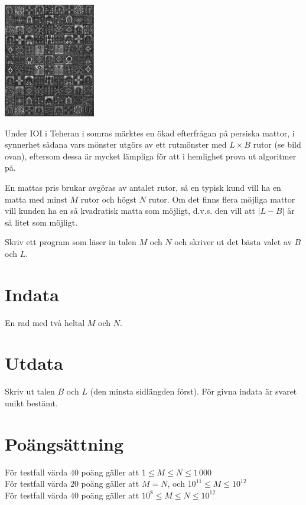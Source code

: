\begin{center}
\includegraphics[width=4cm]{matta.pdf}
\end{center}

Under IOI i Teheran i somras märktes en ökad efterfrågan på persiska
mattor, i synnerhet sådana vars mönster utgörs av ett rutmönster med $L
\times B$ rutor (se bild ovan), eftersom dessa är mycket lämpliga för att i
hemlighet prova ut algoritmer på.

En mattas pris brukar avgöras av antalet rutor, så en typisk kund vill
ha en matta med minst $M$ rutor och högst $N$ rutor. Om det finns flera
möjliga mattor vill kunden ha en så kvadratisk matta som möjligt,
d.v.s. den vill att $|L - B|$ är så litet som möjligt.

Skriv ett program som läser in talen $M$ och $N$ och skriver ut det
bästa valet av $B$ och $L$.

\section*{Indata}

En rad med två heltal $M$ och $N$.

\section*{Utdata}

Skriv ut talen $B$ och $L$ (den minsta sidlängden först). För givna indata är svaret unikt bestämt.

\section*{Poängsättning}
För testfall värda $40$ poäng gäller att $1 \le M \le N \le 1\,000$ \\
För testfall värda $20$ poäng gäller att $M = N$, och $10^{11} \le M \le 10^{12}$ \\
För testfall värda $40$ poäng gäller att $10^8 \le M \le N \le 10^{12}$ \\
